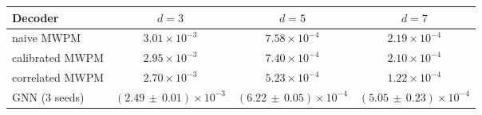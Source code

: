 \begin{tabular}{lccc}
\toprule
Decoder & $d=3$ & $d=5$ & $d=7$ \\
\midrule
naive MWPM & $3.01\times10^{-3}$ & $7.58\times10^{-4}$ & $2.19\times10^{-4}$ \\
calibrated MWPM & $2.95\times10^{-3}$ & $7.40\times10^{-4}$ & $2.10\times10^{-4}$ \\
correlated MWPM & $2.70\times10^{-3}$ & $5.23\times10^{-4}$ & $1.22\times10^{-4}$ \\
GNN (3 seeds) & $(2.49\,\pm\,0.01)\times10^{-3}$ & $(6.22\,\pm\,0.05)\times10^{-4}$ & $(5.05\,\pm\,0.23)\times10^{-4}$ \\
\bottomrule
\end{tabular}
